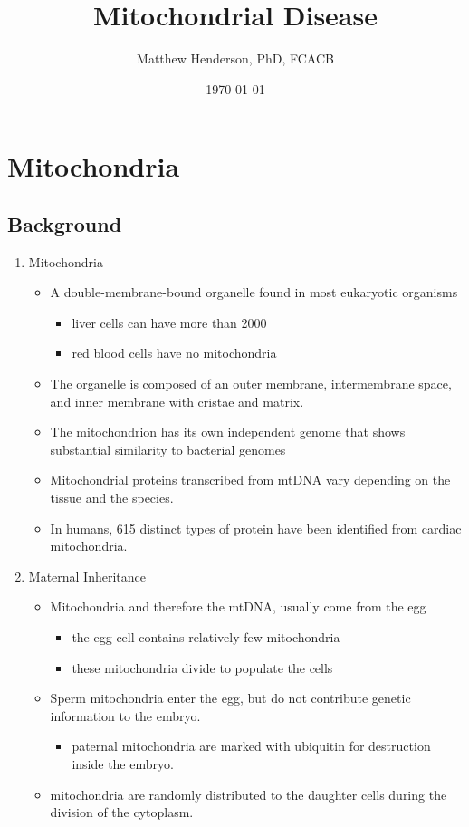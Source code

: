 \documentclass{scrartcl}
\author{Matthew Henderson, PhD, FCACB}
\date{\today}
\title{Mitochondrial Disease}
\begin{document}
\maketitle
\tableofcontents


\section{Mitochondria}
\label{sec:org8d290f7}
\subsection{Background}
\label{sec:orgf015186}
\begin{enumerate}
\item Mitochondria
\label{sec:orgc2b3f90}
\begin{itemize}
\item A double-membrane-bound organelle found in most eukaryotic organisms
\begin{itemize}
\item liver cells can have more than 2000
\item red blood cells have no mitochondria
\end{itemize}

\item The organelle is composed of an outer membrane, intermembrane
space, and inner membrane with cristae and matrix.

\item The mitochondrion has its own independent genome that shows
substantial similarity to bacterial genomes

\item Mitochondrial proteins transcribed from mtDNA vary depending on the
tissue and the species.

\item In humans, 615 distinct types of protein have been identified from
cardiac mitochondria.
\end{itemize}

\item Maternal Inheritance
\label{sec:org790cac5}
\begin{itemize}
\item Mitochondria and therefore the mtDNA, usually come from the egg
\begin{itemize}
\item the egg cell contains relatively few mitochondria
\item these mitochondria divide to populate the cells
\end{itemize}
\item Sperm mitochondria enter the egg, but do not contribute genetic
information to the embryo.
\begin{itemize}
\item paternal mitochondria are marked with ubiquitin for destruction
inside the embryo.
\end{itemize}
\item mitochondria are randomly distributed to the daughter cells during
the division of the cytoplasm.
\end{itemize}


\end{enumerate}
\end{document}
